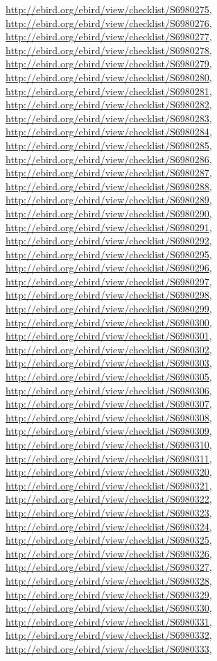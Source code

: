 \documentclass[9pt, article]{memoir}
\begin{document}
\begin{multicols}{2}
\url{http://ebird.org/ebird/view/checklist/S6980275}, 
\url{http://ebird.org/ebird/view/checklist/S6980276}, 
\url{http://ebird.org/ebird/view/checklist/S6980277}, 
\url{http://ebird.org/ebird/view/checklist/S6980278}, 
\url{http://ebird.org/ebird/view/checklist/S6980279}, 
\url{http://ebird.org/ebird/view/checklist/S6980280}, 
\url{http://ebird.org/ebird/view/checklist/S6980281}, 
\url{http://ebird.org/ebird/view/checklist/S6980282}, 
\url{http://ebird.org/ebird/view/checklist/S6980283}, 
\url{http://ebird.org/ebird/view/checklist/S6980284}, 
\url{http://ebird.org/ebird/view/checklist/S6980285}, 
\url{http://ebird.org/ebird/view/checklist/S6980286}, 
\url{http://ebird.org/ebird/view/checklist/S6980287}, 
\url{http://ebird.org/ebird/view/checklist/S6980288}, 
\url{http://ebird.org/ebird/view/checklist/S6980289}, 
\url{http://ebird.org/ebird/view/checklist/S6980290}, 
\url{http://ebird.org/ebird/view/checklist/S6980291}, 
\url{http://ebird.org/ebird/view/checklist/S6980292}, 
\url{http://ebird.org/ebird/view/checklist/S6980295}, 
\url{http://ebird.org/ebird/view/checklist/S6980296}, 
\url{http://ebird.org/ebird/view/checklist/S6980297}, 
\url{http://ebird.org/ebird/view/checklist/S6980298}, 
\url{http://ebird.org/ebird/view/checklist/S6980299}, 
\url{http://ebird.org/ebird/view/checklist/S6980300}, 
\url{http://ebird.org/ebird/view/checklist/S6980301}, 
\url{http://ebird.org/ebird/view/checklist/S6980302}, 
\url{http://ebird.org/ebird/view/checklist/S6980303}, 
\url{http://ebird.org/ebird/view/checklist/S6980305}, 
\url{http://ebird.org/ebird/view/checklist/S6980306}, 
\url{http://ebird.org/ebird/view/checklist/S6980307}, 
\url{http://ebird.org/ebird/view/checklist/S6980308}, 
\url{http://ebird.org/ebird/view/checklist/S6980309}, 
\url{http://ebird.org/ebird/view/checklist/S6980310}, 
\url{http://ebird.org/ebird/view/checklist/S6980311}, 
\url{http://ebird.org/ebird/view/checklist/S6980320}, 
\url{http://ebird.org/ebird/view/checklist/S6980321}, 
\url{http://ebird.org/ebird/view/checklist/S6980322}, 
\url{http://ebird.org/ebird/view/checklist/S6980323}, 
\url{http://ebird.org/ebird/view/checklist/S6980324}, 
\url{http://ebird.org/ebird/view/checklist/S6980325}, 
\url{http://ebird.org/ebird/view/checklist/S6980326}, 
\url{http://ebird.org/ebird/view/checklist/S6980327}, 
\url{http://ebird.org/ebird/view/checklist/S6980328}, 
\url{http://ebird.org/ebird/view/checklist/S6980329}, 
\url{http://ebird.org/ebird/view/checklist/S6980330}, 
\url{http://ebird.org/ebird/view/checklist/S6980331}, 
\url{http://ebird.org/ebird/view/checklist/S6980332}, 
\url{http://ebird.org/ebird/view/checklist/S6980333}, 

\end{multicols}
\end{document}
